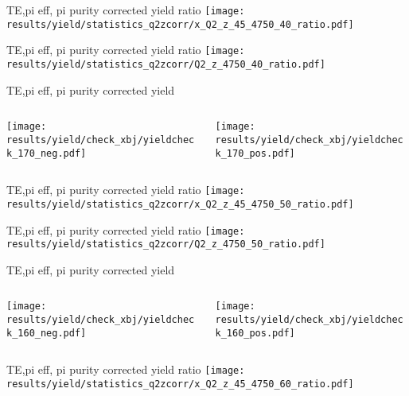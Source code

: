 \begin{frame}{TE,pi eff, pi purity corrected yield ratio}
\texttt{[image: results/yield/statistics\_q2zcorr/x\_Q2\_z\_45\_4750\_40\_ratio.pdf]}
\end{frame}
\begin{frame}{TE,pi eff, pi purity corrected yield ratio}
\texttt{[image: results/yield/statistics\_q2zcorr/Q2\_z\_4750\_40\_ratio.pdf]}
\end{frame}
\begin{frame}{TE,pi eff, pi purity corrected yield}
\begin{columns}
\begin{column}[T]{0.5\textwidth}
\texttt{[image: results/yield/check\_xbj/yieldcheck\_170\_neg.pdf]}
\end{column}
\begin{column}[T]{0.5\textwidth}
\texttt{[image: results/yield/check\_xbj/yieldcheck\_170\_pos.pdf]}
\end{column}
\end{columns}
\end{frame}
\begin{frame}{TE,pi eff, pi purity corrected yield ratio}
\texttt{[image: results/yield/statistics\_q2zcorr/x\_Q2\_z\_45\_4750\_50\_ratio.pdf]}
\end{frame}
\begin{frame}{TE,pi eff, pi purity corrected yield ratio}
\texttt{[image: results/yield/statistics\_q2zcorr/Q2\_z\_4750\_50\_ratio.pdf]}
\end{frame}
\begin{frame}{TE,pi eff, pi purity corrected yield}
\begin{columns}
\begin{column}[T]{0.5\textwidth}
\texttt{[image: results/yield/check\_xbj/yieldcheck\_160\_neg.pdf]}
\end{column}
\begin{column}[T]{0.5\textwidth}
\texttt{[image: results/yield/check\_xbj/yieldcheck\_160\_pos.pdf]}
\end{column}
\end{columns}
\end{frame}
\begin{frame}{TE,pi eff, pi purity corrected yield ratio}
\texttt{[image: results/yield/statistics\_q2zcorr/x\_Q2\_z\_45\_4750\_60\_ratio.pdf]}
\end{frame}
